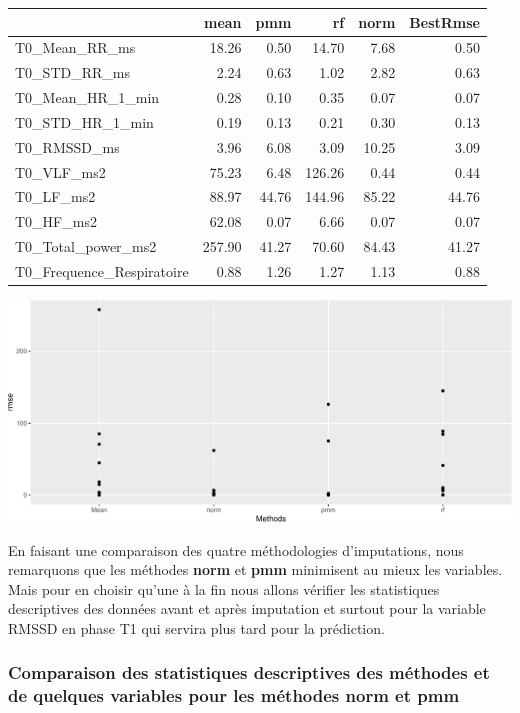 \documentclass[]{article}
\begin{document}
\begin{table}[H]
\centering
\begin{tabular}{l|r|r|r|r|r}
\hline
  & mean & pmm & rf & norm & BestRmse\\
\hline
T0\_Mean\_RR\_ms & 18.26 & 0.50 & 14.70 & 7.68 & 0.50\\
\hline
T0\_STD\_RR\_ms & 2.24 & 0.63 & 1.02 & 2.82 & 0.63\\
\hline
T0\_Mean\_HR\_1\_min & 0.28 & 0.10 & 0.35 & 0.07 & 0.07\\
\hline
T0\_STD\_HR\_1\_min & 0.19 & 0.13 & 0.21 & 0.30 & 0.13\\
\hline
T0\_RMSSD\_ms & 3.96 & 6.08 & 3.09 & 10.25 & 3.09\\
\hline
T0\_VLF\_ms2 & 75.23 & 6.48 & 126.26 & 0.44 & 0.44\\
\hline
T0\_LF\_ms2 & 88.97 & 44.76 & 144.96 & 85.22 & 44.76\\
\hline
T0\_HF\_ms2 & 62.08 & 0.07 & 6.66 & 0.07 & 0.07\\
\hline
T0\_Total\_power\_ms2 & 257.90 & 41.27 & 70.60 & 84.43 & 41.27\\
\hline
T0\_Frequence\_Respiratoire & 0.88 & 1.26 & 1.27 & 1.13 & 0.88\\
\hline
\end{tabular}
\end{table}

\includegraphics{repport_projet_files/figure-latex/unnamed-chunk-24-1.pdf}

En faisant une comparaison des quatre méthodologies d'imputations, nous
remarquons que les méthodes \textbf{norm} et \textbf{pmm} minimisent au
mieux les variables. Mais pour en choisir qu'une à la fin nous allons
vérifier les statistiques descriptives des données avant et après
imputation et surtout pour la variable RMSSD en phase T1 qui servira
plus tard pour la prédiction.

\hypertarget{comparaison-des-statistiques-descriptives-des-muxe9thodes-et-de-quelques-variables-pour-les-muxe9thodes-norm-et-pmm}{%
\subsubsection{Comparaison des statistiques descriptives des méthodes et
de quelques variables pour les méthodes norm et
pmm}\label{comparaison-des-statistiques-descriptives-des-muxe9thodes-et-de-quelques-variables-pour-les-muxe9thodes-norm-et-pmm}}
\end{document}
